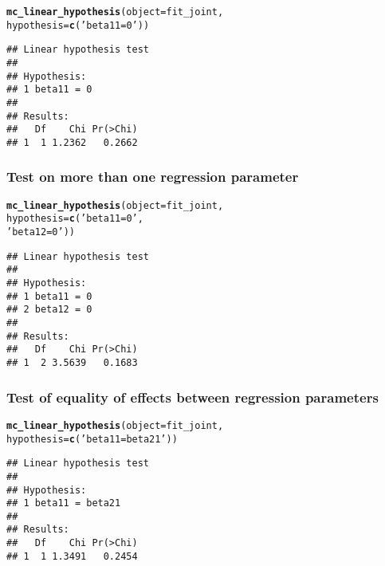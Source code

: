 \documentclass[article]{jss}\usepackage[]{graphicx}\usepackage[]{xcolor}
\makeatletter
\newcommand{\hlstr}[1]{\textcolor[rgb]{0.192,0.494,0.8}{#1}}%
\newcommand{\hlstd}[1]{\textcolor[rgb]{0.345,0.345,0.345}{#1}}%
\newcommand{\hlkwc}[1]{\textcolor[rgb]{0.333,0.667,0.333}{#1}}%
\newcommand{\hlkwd}[1]{\textcolor[rgb]{0.737,0.353,0.396}{\textbf{#1}}}%
\newenvironment{kframe}{%
 \def\at@end@of@kframe{}%
 \ifinner\ifhmode%
  \def\at@end@of@kframe{\end{minipage}}%
  \begin{minipage}{\columnwidth}%
 \fi\fi%
 \def\FrameCommand##1{\hskip\@totalleftmargin \hskip-\fboxsep
 \colorbox{shadecolor}{##1}\hskip-\fboxsep
     \hskip-\linewidth \hskip-\@totalleftmargin \hskip\columnwidth}%
 \MakeFramed {\advance\hsize-\width
   \@totalleftmargin\z@ \linewidth\hsize
   \@setminipage}}%
 {\par\unskip\endMakeFramed%
 \at@end@of@kframe}
\newenvironment{knitrout}{}{} %
\makeatother
\begin{document}
\begin{knitrout}
\color{fgcolor}\begin{kframe}
\begin{alltt}
\hlkwd{mc_linear_hypothesis}\hlstd{(}\hlkwc{object} \hlstd{=  fit_joint,}
                     \hlkwc{hypothesis} \hlstd{=} \hlkwd{c}\hlstd{(}\hlstr{'beta11 = 0'}\hlstd{))}
\end{alltt}
\begin{verbatim}
## Linear hypothesis test
## 
## Hypothesis:            
## 1 beta11 = 0
## 
## Results:
##   Df    Chi Pr(>Chi)
## 1  1 1.2362   0.2662
\end{verbatim}
\end{kframe}
\end{knitrout}

\subsubsection{Test on more than one regression parameter}

\begin{knitrout}
\color{fgcolor}\begin{kframe}
\begin{alltt}
\hlkwd{mc_linear_hypothesis}\hlstd{(}\hlkwc{object} \hlstd{=  fit_joint,}
                     \hlkwc{hypothesis} \hlstd{=} \hlkwd{c}\hlstd{(}\hlstr{'beta11 = 0'}\hlstd{,}
                                    \hlstr{'beta12 = 0'}\hlstd{))}
\end{alltt}
\begin{verbatim}
## Linear hypothesis test
## 
## Hypothesis:            
## 1 beta11 = 0
## 2 beta12 = 0
## 
## Results:
##   Df    Chi Pr(>Chi)
## 1  2 3.5639   0.1683
\end{verbatim}
\end{kframe}
\end{knitrout}

\subsubsection{Test of equality of effects between regression parameters}

\begin{knitrout}
\color{fgcolor}\begin{kframe}
\begin{alltt}
\hlkwd{mc_linear_hypothesis}\hlstd{(}\hlkwc{object} \hlstd{=  fit_joint,}
                     \hlkwc{hypothesis} \hlstd{=} \hlkwd{c}\hlstd{(}\hlstr{'beta11 = beta21'}\hlstd{))}
\end{alltt}
\begin{verbatim}
## Linear hypothesis test
## 
## Hypothesis:                 
## 1 beta11 = beta21
## 
## Results:
##   Df    Chi Pr(>Chi)
## 1  1 1.3491   0.2454
\end{verbatim}
\end{kframe}
\end{knitrout}
\end{document}
